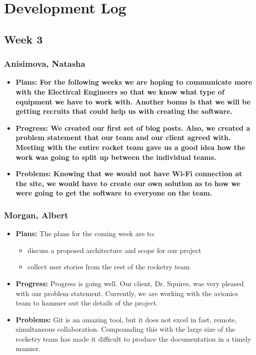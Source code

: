 \documentclass[10pt,draftclsnofoot,onecolumn]{IEEEtran}
\begin{document}
\section{Development Log}


\subsection{Week 3}
\subsubsection{Anisimova, Natasha}
\begin{itemize}
	\item \textbf{Plans: For the following weeks we are hoping to communicate more with the Electircal Engineers so that 
	we know what type of equipment we have to work with. Another bonus is that we will be getting recruits that could 
	help us with creating the software.}
	\item \textbf{Progress: We created our first set of blog posts. Also, we created a problem statement that our team
	and our client agreed with. Meeting with the entire rocket team gave us a good idea how the work was going to split up 
	between the individual teams. }
	\item \textbf{Problems: Knowing that we would not have Wi-Fi connection at the site, we would have to create our own
	solution as to how we were going to get the software to everyone on the team.}
\end{itemize}
\subsubsection{Morgan, Albert}
\begin{itemize}
	\item \textbf{Plans: }
The plans for the coming week are to:
\begin{itemize}
	\item discuss a proposed architecture and scope for our project
	\item collect user stories from the rest of the rocketry team
\end{itemize}
\item \textbf{Progress: }
Progress is going well. Our client, Dr. Squires, was very pleased with our problem statement. Currently, we are working with the avionics team to hammer out the details of the project.
\item \textbf{Problems: }
Git is an amazing tool, but it does not excel in fast, remote, simultaneous collaboration. Compounding this with the large size of the rocketry team has made it difficult to produce the documentation in a timely manner.
\end{itemize}
\end{document}
